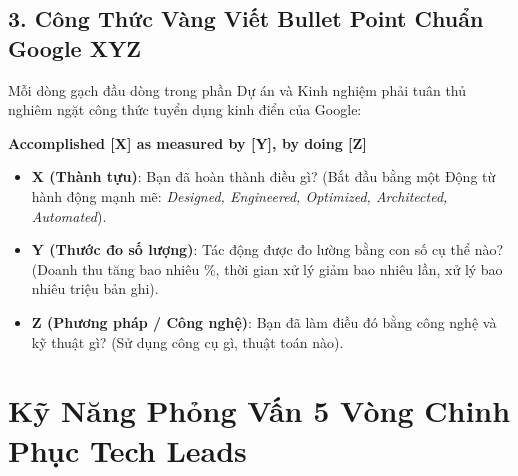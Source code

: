 \subsection{3. Công Thức Vàng Viết Bullet Point Chuẩn Google XYZ}
Mỗi dòng gạch đầu dòng trong phần Dự án và Kinh nghiệm phải tuân thủ nghiêm ngặt công thức tuyển dụng kinh điển của Google:
\begin{center}
\colorbox{navyprimary!10}{\textbf{Accomplished [X] as measured by [Y], by doing [Z]}}
\end{center}
\begin{itemize}
    \item \textbf{X (Thành tựu)}: Bạn đã hoàn thành điều gì? (Bắt đầu bằng một Động từ hành động mạnh mẽ: \textit{Designed, Engineered, Optimized, Architected, Automated}).
    \item \textbf{Y (Thước đo số lượng)}: Tác động được đo lường bằng con số cụ thể nào? (Doanh thu tăng bao nhiêu \%, thời gian xử lý giảm bao nhiêu lần, xử lý bao nhiêu triệu bản ghi).
    \item \textbf{Z (Phương pháp / Công nghệ)}: Bạn đã làm điều đó bằng công nghệ và kỹ thuật gì? (Sử dụng công cụ gì, thuật toán nào).
\end{itemize}

\section{Kỹ Năng Phỏng Vấn 5 Vòng Chinh Phục Tech Leads}

